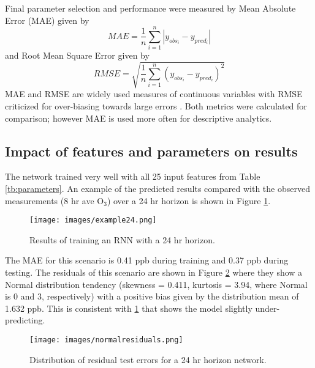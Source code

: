 Final parameter selection and performance were measured by Mean Absolute Error (MAE) given by 
%
\begin{equation}
\label{eq:MAE}
MAE = \frac{1}{n}\sum^{n}_{i=1} \left | y_{obs_{i}}- y_{pred_{i}} \right |
\end{equation}
%
and Root Mean Square Error given by
%
\begin{equation}
\label{eq:RMSE}
RMSE = \sqrt{\frac{1}{n}\sum^{n}_{i=1} \left ( y_{obs_{i}}- y_{pred_{i}} \right )^{2}}
\end{equation}
%
MAE and RMSE are widely used measures of continuous variables with RMSE criticized for over-biasing towards large errors \citep{Chai2014, Willmott2005}. Both metrics were calculated for comparison; however MAE is used more often for descriptive analytics.

\subsection{Impact of features and parameters on results}

The network trained very well with all 25 input features from Table \ref{tb:parameters}. An example of the predicted results compared with the observed measurements (8 hr ave O$_{3}$) over a 24 hr horizon is shown in Figure \ref{fig:example24}.
%
\begin{figure}[H]
\centering
\texttt{[image: images/example24.png]}
\caption{Results of training an RNN with a 24 hr horizon.}
\label{fig:example24}
\end{figure}
%
The MAE for this scenario is 0.41 ppb during training and 0.37 ppb during testing. The residuals of this scenario are shown in Figure \ref{fig:normalresiduals} where they show a Normal distribution tendency (skewness = 0.411, kurtosis = 3.94, where Normal is 0 and 3, respectively) with a positive bias given by the distribution mean of 1.632 ppb. This is consistent with \ref{fig:example24} that shows the model slightly under-predicting.

%
\begin{figure}[H]
\centering
\texttt{[image: images/normalresiduals.png]}
\caption{Distribution of residual test errors for a 24 hr horizon network.}
\label{fig:normalresiduals}
\end{figure}
%

